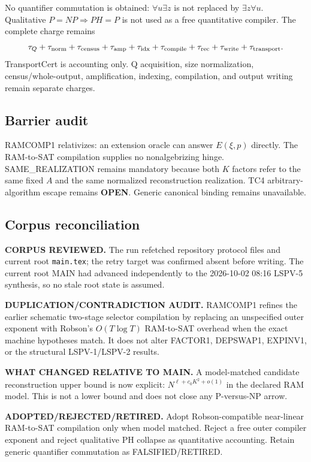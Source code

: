 \documentclass[11pt]{article}
\begin{document}
No quantifier commutation is obtained: $\forall u\exists z$ is not replaced by $\exists z\forall u$. Qualitative $P=NP\Rightarrow PH=P$ is not used as a free quantitative compiler. The complete charge remains
\[
\tau_Q+\tau_{\rm norm}+\tau_{\rm census}+\tau_{\rm amp}+\tau_{\rm idx}+\tau_{\rm compile}+\tau_{\rm rec}+\tau_{\rm write}+\tau_{\rm transport}.
\]
TransportCert is accounting only. Q acquisition, size normalization, census/whole-output, amplification, indexing, compilation, and output writing remain separate charges.

\subsection*{Barrier audit}
RAMCOMP1 relativizes: an extension oracle can answer $E(\xi,p)$ directly. The RAM-to-SAT compilation supplies no nonalgebrizing hinge. SAME\_REALIZATION remains mandatory because both $K$ factors refer to the same fixed $A$ and the same normalized reconstruction realization. TC4 arbitrary-algorithm escape remains \textbf{OPEN}. Generic canonical binding remains unavailable.

\subsection*{Corpus reconciliation}
\textbf{CORPUS REVIEWED.} The run refetched repository protocol files and current root \texttt{main.tex}; the retry target was confirmed absent before writing. The current root MAIN had advanced independently to the 2026-10-02 08:16 LSPV-5 synthesis, so no stale root state is assumed.

\textbf{DUPLICATION/CONTRADICTION AUDIT.} RAMCOMP1 refines the earlier schematic two-stage selector compilation by replacing an unspecified outer exponent with Robson's $O(T\log T)$ RAM-to-SAT overhead when the exact machine hypotheses match. It does not alter FACTOR1, DEPSWAP1, EXPINV1, or the structural LSPV-1/LSPV-2 results.

\textbf{WHAT CHANGED RELATIVE TO MAIN.} A model-matched candidate reconstruction upper bound is now explicit: $N^{\ell+c_0K^2+o(1)}$ in the declared RAM model. This is not a lower bound and does not close any P-versus-NP arrow.

\textbf{ADOPTED/REJECTED/RETIRED.} Adopt Robson-compatible near-linear RAM-to-SAT compilation only when model matched. Reject a free outer compiler exponent and reject qualitative PH collapse as quantitative accounting. Retain generic quantifier commutation as FALSIFIED/RETIRED.
\end{document}
